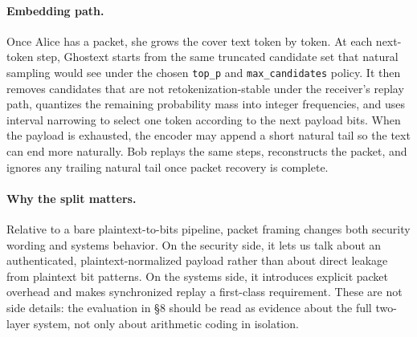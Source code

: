 \paragraph{Embedding path.} Once Alice has a packet, she grows the cover text token by token. At each next-token step, Ghostext starts from the same truncated candidate set that natural sampling would see under the chosen \texttt{top\_p} and \texttt{max\_candidates} policy. It then removes candidates that are not retokenization-stable under the receiver's replay path, quantizes the remaining probability mass into integer frequencies, and uses interval narrowing to select one token according to the next payload bits. When the payload is exhausted, the encoder may append a short natural tail so the text can end more naturally. Bob replays the same steps, reconstructs the packet, and ignores any trailing natural tail once packet recovery is complete.

\paragraph{Why the split matters.} Relative to a bare plaintext-to-bits pipeline, packet framing changes both security wording and systems behavior. On the security side, it lets us talk about an authenticated, plaintext-normalized payload rather than about direct leakage from plaintext bit patterns. On the systems side, it introduces explicit packet overhead and makes synchronized replay a first-class requirement. These are not side details: the evaluation in \S8 should be read as evidence about the full two-layer system, not only about arithmetic coding in isolation.
